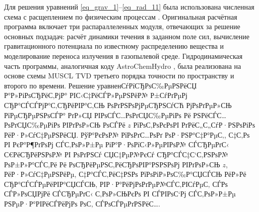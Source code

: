 \documentclass[a4paper,11pt,twoside]{article}
\begin{document}
Для решения уравнений \eqref{eq_grav_1}--\eqref{eq_rad_11} была использована численная схема с расщеплением по физическим процессам \cite{Koven1981,Marchuk1988}. Оригинальная расчётная программа включает три распараллеленных модуля, отвечающих за решение основных подзадач: расчёт динамики течения в заданном поле сил, вычисление гравитационного потенциала по известному распределению вещества и моделирование переноса излучения в газопылевой среде.  Гидродинамическая часть программы, аналогичная коду AstroChemHydro \cite{Eremin2012}, была реализована на основе схемы MUSCL TVD \cite{Kolgan1972,Toro1999, vanleer1, vanleer2} третьего порядка точности по пространству и второго по времени. Решение уравненСѓРїСЂРѕС‰РµРЅРёСЏ Р°Р»РіРѕСЂРёС‚РјР° РІС‹С‡РёСЃР»РµРЅРёР№ Р±СѓРґРµРј СЂР°СЃСЃРјР°С‚СЂРёРІР°С‚СЊ РѕРґРЅРѕРјРµСЂРЅСѓСЋ РјРѕРґРµР»СЊ РїРµСЂРµРЅРѕСЃР° РґР»СЏ РІРѕСЃС…РѕРґСЏС‰РµРіРѕ Рё РЅРёСЃС…РѕРґСЏС‰РµРіРѕ РІРґРѕР»СЊ РѕСЃРё $z$ РїРѕС‚РѕРєРѕРІ РґРёС„С„СѓР·РЅРѕРіРѕ РёР·Р»СѓС‡РµРЅРёСЏ. РўР°РєРѕР№ РїРѕРґС…РѕРґ РѕР·РЅР°С‡Р°РµС‚, С‡С‚Рѕ РІ РєР°Р¶РґРѕРј СЃС‚РѕР»Р±Рµ РіР°Р·РѕРїС‹Р»РµРІРѕР№ СЃСЂРµРґС‹ С€РёСЂРёРЅРѕР№ РІ РѕРґРЅСѓ СЏС‡РµР№РєСѓ СЂР°СЃС‡С‘С‚РЅРѕР№ РѕР±Р»Р°СЃС‚Рё Рё РѕСЂРёРµРЅС‚РёСЂРѕРІР°РЅРЅРѕРј РІРґРѕР»СЊ $z$, РёР·Р»СѓС‡РµРЅРёРµ, С‡Р°СЃС‚РёС‡РЅРѕ РїРѕРіР»РѕС‰Р°СЏСЃСЊ РёР»Рё СЂР°СЃСЃРµРёРІР°СЏСЃСЊ, РІР·Р°РёРјРѕРґРµР№СЃС‚РІСѓРµС‚ СЃРѕ СЃР»РѕСЏРјРё СЃСЂРµРґС‹ С‚РѕР»СЊРєРѕ РІ СЃРІРѕС‘Рј СЃС‚РѕР»Р±Рµ РЅРµР·Р°РІРёСЃРёРјРѕ РѕС‚ СЃРѕСЃРµРґРЅРёС….

\end{document}
